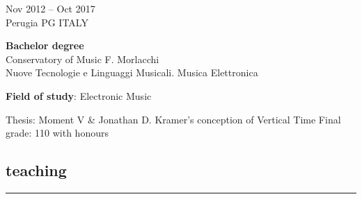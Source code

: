 \documentclass[7pt,a4paper]{article}
\begin{document}
\begin{mdframed}[
    backgroundcolor=white,
    linecolor=white,
    linewidth=0pt,
    innerleftmargin=6pt,
    innerrightmargin=6pt,
    innertopmargin=6pt,
    innerbottommargin=6pt,
    skipabove=0pt,
    skipbelow=0pt
]

\begin{minipage}[t]{0.28\textwidth}

Nov 2012 – Oct 2017
\\\scriptsize Perugia PG ITALY

\end{minipage}
\begin{minipage}[t]{0.68\textwidth}
\normalsize
\textbf{Bachelor degree}\\
Conservatory of Music F. Morlacchi
\\ \small Nuove Tecnologie e Linguaggi Musicali. Musica Elettronica
\par \vspace{0.1cm} 

\par \scriptsize \textbf{Field of study}: Electronic Music
 

\scriptsize Thesis: Moment V \& Jonathan D. Kramer’s conception of Vertical Time
 Final grade: 110 with honours

\end{minipage}
\vspace{0.25cm}
\end{mdframed}



\subsection*{teaching}
\normalsize
\vspace{-0.5cm}
\rule{\textwidth}{0.4pt}
\vspace{0.1cm}
\end{document}
